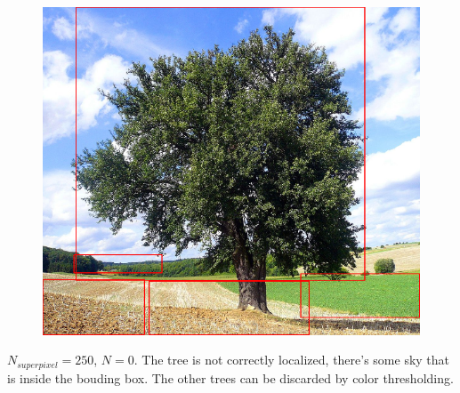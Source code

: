 \documentclass[a4paper,titlepaget]{article}
\begin{document}
\begin{figure}[htpb]
	\centering
	\includegraphics[width=.9\textwidth]{images/results/5fin}
\end{figure}
$N_{superpixel}=250$, $N=0$. The tree is not correctly localized, there's some sky that is inside the bouding box. The other trees can be discarded by color thresholding.
\newpage
\end{document}
